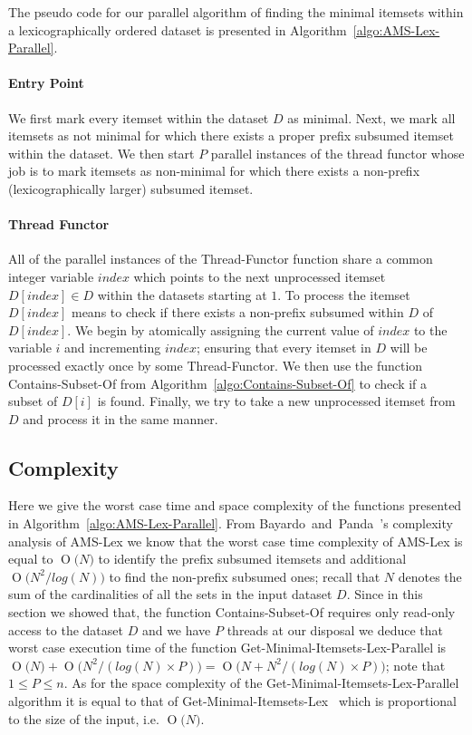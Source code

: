 \documentclass[13pt,a4paper]{article}
\newcommand{\BigO}[1]{\ensuremath{\operatorname{O}\bigl(#1\bigr)}}
\begin{document}
The pseudo code for our parallel algorithm of finding the minimal itemsets within a lexicographically ordered dataset is presented in Algorithm~\ref{algo:AMS-Lex-Parallel}.

\paragraph{Entry Point}
We first mark every itemset within the dataset $D$ as minimal. Next, we mark all itemsets as not minimal for which there exists a proper prefix subsumed itemset within the dataset. We then start $P$ parallel instances of the thread functor whose job is to mark itemsets as non-minimal for which there exists a non-prefix (lexicographically larger) subsumed itemset. 

\paragraph{Thread Functor}
All of the parallel instances of the Thread-Functor function share a common integer variable $index$ which points to the next unprocessed itemset $D[index] \in D$ within the datasets starting at $1$. To process the itemset $D[index]$ means to check if there exists a non-prefix subsumed within $D$ of $D[index]$. We begin by atomically assigning the current value of $index$ to the variable $i$ and incrementing $index$; ensuring that every itemset in $D$ will be processed exactly once by some Thread-Functor. We then use the function Contains-Subset-Of from Algorithm~\ref{algo:Contains-Subset-Of} to check if a subset of $D[i]$ is found. Finally, we try to take a new unprocessed itemset from $D$ and process it in the same manner.


\subsection{Complexity}
Here we give the worst case time and space complexity of the functions presented in Algorithm~\ref{algo:AMS-Lex-Parallel}. From Bayardo~and~Panda~\cite{BayardoPanda11}'s complexity analysis of AMS-Lex we know that the worst case time complexity of AMS-Lex is equal to  $\BigO{ N }$ to identify the prefix subsumed itemsets and additional $\BigO{ N^2 / log(N) }$ to find the non-prefix subsumed ones; recall that $N$ denotes the sum of the cardinalities of all the sets in the input dataset $D$. Since in this section we showed that, the function Contains-Subset-Of requires only read-only access to the dataset $D$ and we have $P$ threads at our disposal we deduce that worst case execution time of the function Get-Minimal-Itemsets-Lex-Parallel is $\BigO{ N } + \BigO{ N^2 / (log(N) \times P) } = \BigO{ N + N^2 / (log(N) \times P) } $; note that $1 \leq P \leq n$. As for the space complexity of the Get-Minimal-Itemsets-Lex-Parallel algorithm it is equal to that of Get-Minimal-Itemsets-Lex~\cite{BayardoPanda11} which is proportional to the size of the input, i.e. $\BigO{ N }$.
\end{document}
